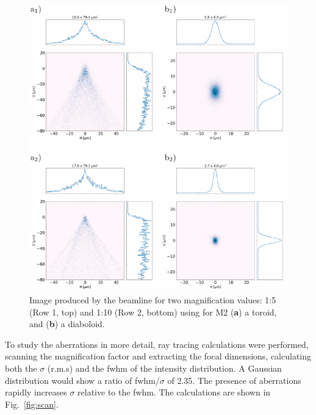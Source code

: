 \documentclass[preprint]{iucr}       %
\newcommand{\inred}[1]{{\color{red}#1}}
\begin{document}
\begin{figure}\label{fig:demagnification}
\includegraphics[width=1.0\textwidth]{figures/fig5.pdf}
% 
% 
\caption{Image produced by the beamline for two magnification values: 1:5 (Row 1, top) and 1:10 (Row 2, bottom) using for M2 (\textbf{a}) a toroid, and (\textbf{b}) a diaboloid.}
\end{figure}

To study the aberrations in more detail, ray tracing calculations were performed, scanning the magnification factor and extracting the focal dimensions, \inred{calculating both the $\sigma$ (r.m.s) and} the fwhm of the intensity distribution. A Gaussian distribution would show a ratio of fwhm/$\sigma$ of 2.35. The presence of aberrations rapidly increases $\sigma$ relative to the fwhm. The calculations are shown in Fig.~\ref{fig:scan}.
\end{document}
